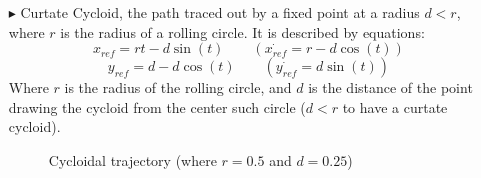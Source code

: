 \begin{itemize}
\begin{itemize}
				\item[$\blacktriangleright$]Curtate Cycloid, the path traced out by a fixed point at a radius $d<r$, where $r$ is the radius of a rolling circle. It is described by equations:
				\[x_{ref} = rt - d\sin(t) \qquad (\dot{x_{ref}} = r - d\cos(t) ) \]
				\[y_{ref} = d - d\cos(t) \qquad (\dot{y_{ref}} = d \sin(t)) \]
				Where $r$ is the radius of the rolling circle, and $d$ is the distance of the point drawing the 
				cycloid from the center such circle ($d<r$ to have a curtate cycloid).

				\begin{figure}[H]
					\caption{Cycloidal trajectory (where $r = 0.5$ and $d = 0.25$)}
					\end{figure}


\end{itemize}
\end{itemize}
